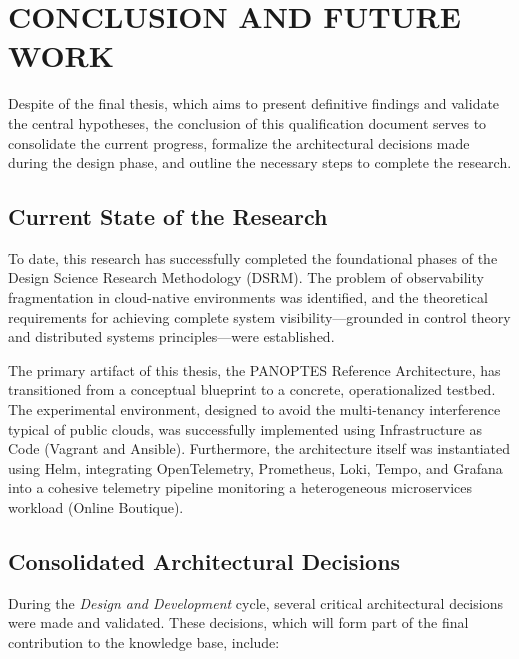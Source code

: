 \chapter{CONCLUSION AND FUTURE WORK}
\label{chap:conclusion}

Despite of the final thesis, which aims to present definitive findings and validate the central hypotheses, the conclusion of this qualification document serves to consolidate the current progress, formalize the architectural decisions made during the design phase, and outline the necessary steps to complete the research.

\section{Current State of the Research}

To date, this research has successfully completed the foundational phases of the Design Science Research Methodology (DSRM). The problem of observability fragmentation in cloud-native environments was identified, and the theoretical requirements for achieving complete system visibility—grounded in control theory and distributed systems principles—were established.

The primary artifact of this thesis, the PANOPTES Reference Architecture, has transitioned from a conceptual blueprint to a concrete, operationalized testbed. The experimental environment, designed to avoid the multi-tenancy interference typical of public clouds, was successfully implemented using Infrastructure as Code (Vagrant and Ansible). Furthermore, the architecture itself was instantiated using Helm, integrating OpenTelemetry, Prometheus, Loki, Tempo, and Grafana into a cohesive telemetry pipeline monitoring a heterogeneous microservices workload (Online Boutique).

\section{Consolidated Architectural Decisions}

During the \textit{Design and Development} cycle, several critical architectural decisions were made and validated. These decisions, which will form part of the final contribution to the knowledge base, include:

